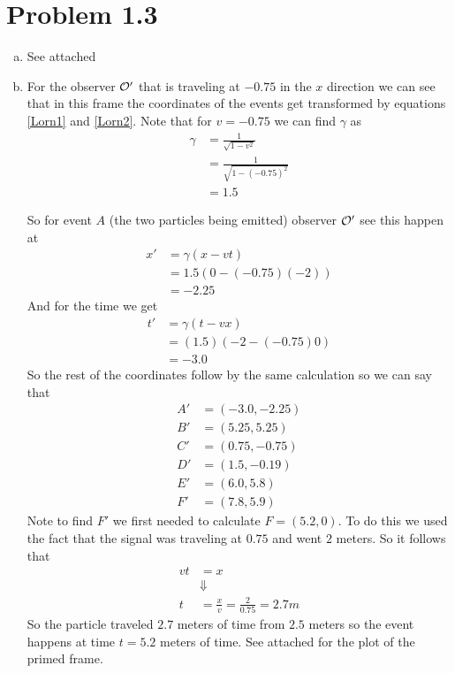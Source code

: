 \documentclass[11pt]{article}
\numberwithin{equation}{section}
\begin{document}
\section{Problem 1.3}
\begin{enumerate}[(a)]
\item
See attached

\item
For the observer $\mathcal{O}'$ that is traveling at $-0.75$ in the $x$ direction we can see that in this frame the coordinates of the events get transformed by equations \ref{Lorn1} and \ref{Lorn2}. Note that for $v=-0.75$ we can find $\gamma$ as
\begin{align*}
\gamma &= \frac{1}{\sqrt{1-v^2}}\\
&= \frac{1}{\sqrt{1-(-0.75)^2}}\\
&= 1.5
\end{align*}

So for event $A$ (the two particles being emitted) observer $\mathcal{O}'$ see this happen at
\begin{align*}
x' &= \gamma(x - vt)\\
&= 1.5(0 - (-0.75)(-2))\\
&= -2.25
\end{align*}
And for the time we get
\begin{align*}
t' &= \gamma(t - vx)\\
&= (1.5)(-2 - (-0.75)0)\\
&= -3.0
\end{align*}
So the rest of the coordinates follow by the same calculation so we can say that
\begin{align*}
A' &= (-3.0, -2.25)\\
B' &= (5.25, 5.25)\\
C' &= (0.75, -0.75)\\
D' &= (1.5, -0.19)\\
E' &= (6.0, 5.8)\\
F' &= (7.8, 5.9)
\end{align*}
Note to find $F'$ we first needed to calculate $F = (5.2,0)$. To do this we used the fact that the signal was traveling at $0.75$ and went $2$ meters. So it follows that
\begin{align*}
vt &= x\\
&\Downarrow\\
t &= \frac{x}{v} = \frac{2}{0.75} = 2.7\unit{m}
\end{align*}
So the particle traveled $2.7$ meters of time from $2.5$ meters so the event happens at time $t=5.2$ meters of time. See attached for the plot of the primed frame.


\end{enumerate}
\end{document}
